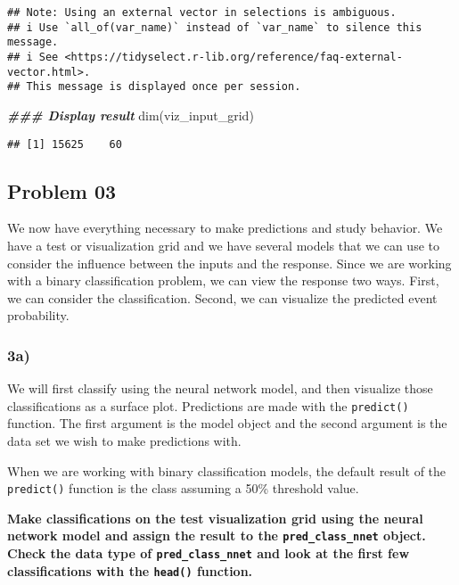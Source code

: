 \documentclass[
]{article}
\newenvironment{Shaded}{\begin{snugshade}}{\end{snugshade}}
\newcommand{\DocumentationTok}[1]{\textcolor[rgb]{0.56,0.35,0.01}{\textbf{\textit{#1}}}}
\newcommand{\FunctionTok}[1]{\textcolor[rgb]{0.00,0.00,0.00}{#1}}
\newcommand{\NormalTok}[1]{#1}
\begin{document}
\begin{verbatim}
## Note: Using an external vector in selections is ambiguous.
## i Use `all_of(var_name)` instead of `var_name` to silence this message.
## i See <https://tidyselect.r-lib.org/reference/faq-external-vector.html>.
## This message is displayed once per session.
\end{verbatim}

\begin{Shaded}
\begin{Highlighting}[]
\DocumentationTok{\#\#\# Display result}
\FunctionTok{dim}\NormalTok{(viz\_input\_grid)}
\end{Highlighting}
\end{Shaded}

\begin{verbatim}
## [1] 15625    60
\end{verbatim}

\hypertarget{problem-03}{%
\subsection{Problem 03}\label{problem-03}}

We now have everything necessary to make predictions and study behavior.
We have a test or visualization grid and we have several models that we
can use to consider the influence between the inputs and the response.
Since we are working with a binary classification problem, we can view
the response two ways. First, we can consider the classification.
Second, we can visualize the predicted event probability.

\hypertarget{a-2}{%
\subsubsection{3a)}\label{a-2}}

We will first classify using the neural network model, and then
visualize those classifications as a surface plot. Predictions are made
with the \texttt{predict()} function. The first argument is the model
object and the second argument is the data set we wish to make
predictions with.

When we are working with binary classification models, the default
result of the \texttt{predict()} function is the class assuming a 50\%
threshold value.

\textbf{Make classifications on the test visualization grid using the
neural network model and assign the result to the
\texttt{pred\_class\_nnet} object. Check the data type of
\texttt{pred\_class\_nnet} and look at the first few classifications
with the \texttt{head()} function.}
\end{document}
